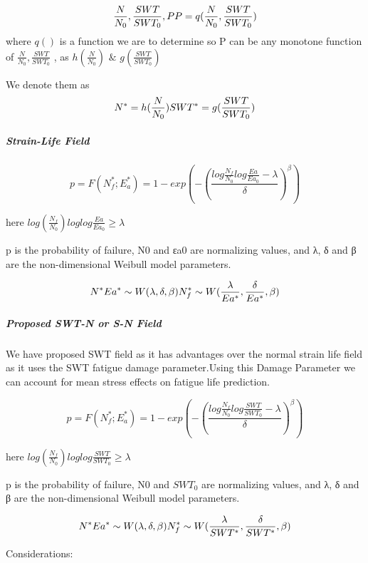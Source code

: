\documentclass[11pt]{article}
\begin{document}
\[
\frac{N}{N_0},\frac{SWT}{SWT_0},P \\
P = q(\frac{N}{N_0},\frac{SWT}{SWT_0})
\] where \(q()\) is a function we are to determine so P can be any
monotone function of \(\frac{N}{N_0},\frac{SWT}{SWT_0}\) , as
\(h(\frac{N}{N_0})\) \(\&\) \(g(\frac{SWT}{SWT_0})\)

We denote them as \[
N^* = h(\frac{N}{N_0}) \\
SWT^* = g(\frac{SWT}{SWT_0})
\]

\hypertarget{strain-life-field}{%
\subparagraph{Strain-Life Field}\label{strain-life-field}}

\[
p = F(N^*_f;E^*_a) = 1 - exp(-(\frac{log\frac{N_f}{N_0}log\frac{Ea}{Ea_0}-\lambda}{\delta})^\beta)
\]

here \(log(\frac{N_f}{N_0})loglog\frac{Ea}{Ea_0} \geq \lambda\)

p is the probability of failure, N0 and εa0 are normalizing values, and
λ, δ and β are the non-dimensional Weibull model parameters.

\[
N^*Ea^* \sim W(\lambda,\delta,\beta) \\
N^*_f\sim W(\frac{\lambda}{Ea^* },\frac{\delta}{Ea^* },\beta) \\
\]

\hypertarget{proposed-swt-n-or-s-n-field}{%
\subparagraph{Proposed SWT-N or S-N
Field}\label{proposed-swt-n-or-s-n-field}}

We have proposed SWT field as it has advantages over the normal strain
life field as it uses the SWT fatigue damage parameter.Using this Damage
Parameter we can account for mean stress effects on fatigue life
prediction.

\[
p = F(N^*_f;E^*_a) = 1 - exp(-(\frac{log\frac{N_f}{N_0}log\frac{SWT}{SWT_0}-\lambda}{\delta})^\beta)
\]

here \(log(\frac{N_f}{N_0})loglog\frac{SWT}{SWT_0} \geq \lambda\)

p is the probability of failure, N0 and \(SWT_0\) are normalizing
values, and λ, δ and β are the non-dimensional Weibull model parameters.

\[
N^*Ea^* \sim W(\lambda,\delta,\beta) \\
N^*_f\sim W(\frac{\lambda}{SWT^* },\frac{\delta}{SWT^* },\beta) \\
\]

Considerations:
\end{document}
